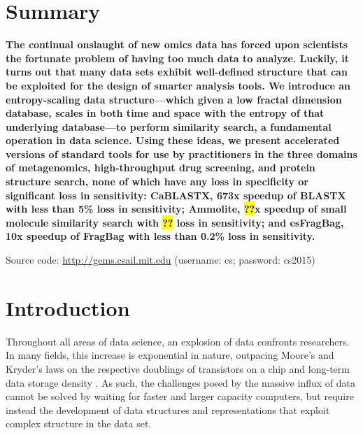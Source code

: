 \documentclass[review,preprint,12pt]{elsarticle}
\renewcommand{\cite}{\citep} %
\theoremstyle{definition}
\theoremstyle{remark}
\numberwithin{equation}{section}
\begin{document}
\section{Summary}
{ \bfseries
    The continual onslaught of new omics data has forced upon scientists the fortunate problem of having too much data to analyze.
    Luckily, it turns out that many data sets exhibit well-defined structure that can be exploited for the design of 
smarter analysis tools.
    We introduce an entropy-scaling data structure---which given a low fractal dimension database, scales in both time and space with the entropy of that underlying database---to perform similarity search, a fundamental operation in data science.
    Using these ideas, we present accelerated versions of standard tools for use by practitioners in the three domains of metagenomics, high-throughput drug screening, and protein structure search, none of which have any loss in specificity or significant loss in sensitivity:
    CaBLASTX, 673x speedup of BLASTX with less than 5\% loss in sensitivity; Ammolite, \hl{??}x speedup of small molecule similarity search with \hl{??} loss in sensitivity; and esFragBag, 10x speedup of FragBag with less than 0.2\% loss in sensitivity.

    Source code: \url{http://gems.csail.mit.edu} (username: cs; password: cs2015)
}

\section{Introduction}
Throughout all areas of data science, an explosion of data confronts 
researchers.
In many fields, this increase is exponential in nature, outpacing Moore's and Kryder's laws on the respective doublings of transistors on a chip and long-term data storage density \cite{kahn2011future}.
As such, the challenges posed by the massive influx of data cannot be solved by waiting for faster and larger capacity computers, but require instead the development of data structures and representations that exploit complex
structure in the data set.
\end{document}
